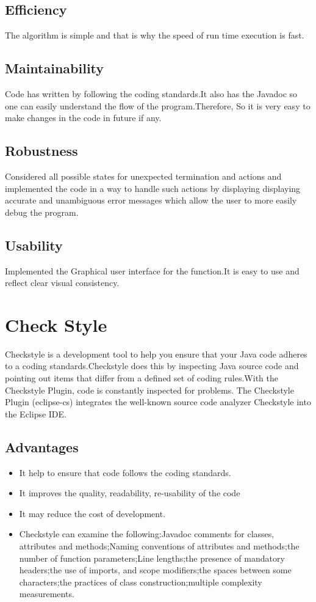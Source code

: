 \documentclass[a4paper, 11pt]{article}
\begin{document}
\subsection{Efficiency}
The algorithm is simple and that is why the speed of run time execution is fast.

\subsection{Maintainability}
Code has written by following the coding standards.It also has the Javadoc so one can easily understand the flow of the program.Therefore, So it is very easy to make changes in the code in future if any.

\subsection{Robustness}
Considered all possible states for unexpected termination and actions and implemented the code in a way to handle such actions by displaying displaying accurate and unambiguous error messages which allow the user to more easily debug the program.

\subsection{Usability}
Implemented the Graphical user interface for the function.It is easy to use and reflect clear visual consistency.

\section{Check Style}

Checkstyle is a development tool to help you ensure that your Java code adheres to a coding standards.Checkstyle does this by inspecting Java source code and pointing out items that differ from a defined set of coding rules.With the Checkstyle Plugin, code is constantly inspected for problems.
The Checkstyle Plugin (eclipse-cs) integrates the well-known source code analyzer Checkstyle into the Eclipse IDE. 

\subsection{Advantages}
\begin{itemize}
  \item It help to ensure that code follows the coding standards.
  \item It improves the quality, readability, re-usability of the code 
  \item It may reduce the cost of development. 
  \item  Checkstyle can examine the following:Javadoc comments for classes, attributes and methods;Naming conventions of attributes and methods;the number of function parameters;Line lengths;the presence of mandatory headers;the use of imports, and scope modifiers;the spaces between some characters;the practices of class construction;multiple complexity measurements.
 \end{itemize}
  
\end{document}

